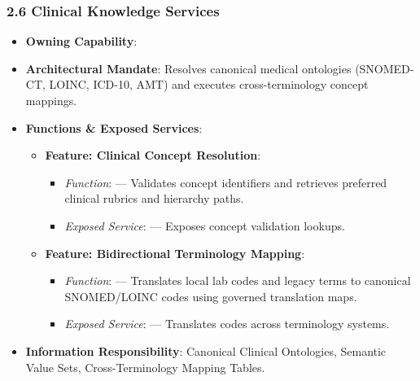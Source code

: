 \par\smallskip
{}\label{rad:ise:125}
\subsubsection*{2.6 Clinical Knowledge Services}
\label{rad:ise:126}

\begin{itemize}

\item
\textbf{Owning Capability}: \texttt{}



\item
\textbf{Architectural Mandate}: Resolves canonical medical ontologies (SNOMED-CT, LOINC, ICD-10, AMT) and executes cross-terminology concept mappings.



\item
\textbf{Functions \& Exposed Services}:


\begin{itemize}

\item
\textbf{Feature: Clinical Concept Resolution}:


\begin{itemize}

\item
\emph{Function}: \texttt{} — Validates concept identifiers and retrieves preferred clinical rubrics and hierarchy paths.



\item
\emph{Exposed Service}: \texttt{} — Exposes concept validation lookups.



\end{itemize}


\item
\textbf{Feature: Bidirectional Terminology Mapping}:


\begin{itemize}

\item
\emph{Function}: \texttt{} — Translates local lab codes and legacy terms to canonical SNOMED/\allowbreak{}LOINC codes using governed translation maps.



\item
\emph{Exposed Service}: \texttt{} — Translates codes across terminology systems.



\end{itemize}


\end{itemize}


\item
\textbf{Information Responsibility}: Canonical Clinical Ontologies, Semantic Value Sets, Cross-Terminology Mapping Tables.



\end{itemize}
